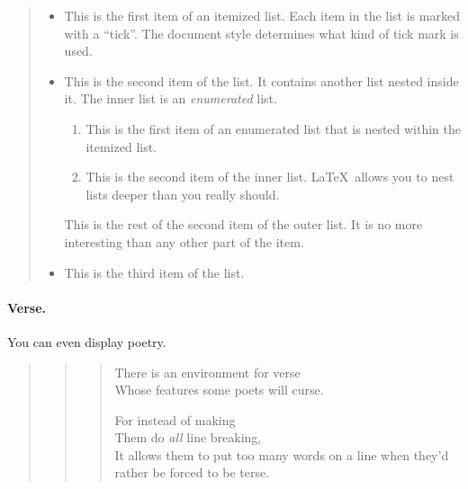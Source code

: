 \begin{quote}
\begin{itemize}
   \item  This is the first item of an itemized list.  Each item
          in the list is marked with a ``tick''.  The document
          style determines what kind of tick mark is used.

   \item  This is the second item of the list.  It contains another
          list nested inside it.  The inner list is an {\em enumerated}
          list.
          \begin{enumerate}
              \item This is the first item of an enumerated list that
                    is nested within the itemized list.

              \item This is the second item of the inner list.  \LaTeX\
                    allows you to nest lists deeper than you really should.
          \end{enumerate}
          This is the rest of the second item of the outer list.  It
          is no more interesting than any other part of the item.
   \item  This is the third item of the list.
\end{itemize}
\end{quote}

\paragraph{Verse.}
You can even display poetry.


\begin{quote}
\begin{quote}
\begin{verse}
   There is an environment for verse \\    %
   Whose features some poets will curse.   %


   For instead of making\\
   Them do {\em all\/} line breaking, \\
   It allows them to put too many words on a line when they'd
   rather be forced to be terse.
\end{verse}
\end{quote}
\end{quote}

